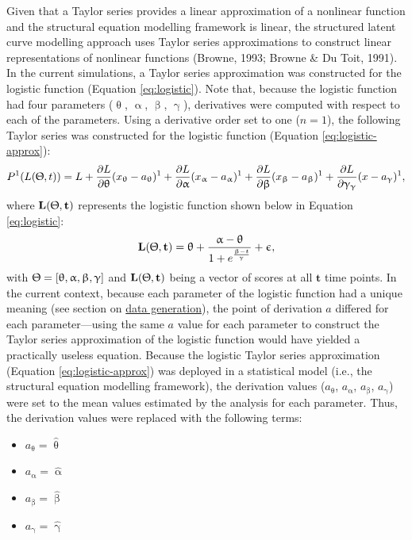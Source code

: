\documentclass[
12pt, %
twoside,
english]{guelphthesis}
\theoremstyle{definition}
\theoremstyle{definition}
\theoremstyle{definition}
\theoremstyle{definition}
\theoremstyle{remark}
\begin{document}
Given that a Taylor series provides a linear approximation of a
nonlinear function and the structural equation modelling framework is linear, the structured latent curve modelling approach uses Taylor series approximations to construct linear representations of nonlinear functions (Browne, 1993; Browne \& Du Toit, 1991). In the current simulations, a Taylor series approximation was constructed for the logistic function (Equation \ref{eq:logistic}). Note that, because the logistic function had four parameters (\(\uptheta\),
\(\upalpha\), \(\upbeta\), \(\upgamma\)), derivatives were computed with
respect to each of the parameters. Using a derivative order set to one
(\(n = 1\)), the following Taylor series was constructed for the logistic
function (Equation \ref{eq:logistic-approx}):
\begin{align}
 P^1(L(\Uptheta, t)) = L + \frac{\partial L}{\partial \uptheta}(x_{\uptheta}-a_{\uptheta})^1 + \frac{\partial L}{\partial \upalpha}(x_{\upalpha}-a_{\upalpha})^1 + \frac{\partial L}{\partial \upbeta}(x_{\upbeta}-a_{\upbeta})^1 + \frac{\partial L}{\partial \upgamma_{\upgamma}}(x-a_{\upgamma})^1, 
\label{eq:logistic-approx}
\end{align}
\noindent where \(\mathbf{L(\Uptheta, t)}\) represents the logistic function shown below in
Equation \ref{eq:logistic}:
\begin{align}
  \mathbf{L(\Uptheta, t)} = \uptheta + \frac{\upalpha - \uptheta}{{1 + e^\frac{\upbeta - t}{\upgamma}}} + \upepsilon, 
\label{eq:logistic}
\end{align}
\noindent with \(\Uptheta = [\uptheta, \upalpha, \upbeta, \upgamma]\) and \(\mathbf{L(\Uptheta, t)}\) being a vector of scores at all \(\mathbf{t}\) time points. In the current context, because each parameter of the logistic function had a unique meaning (see section on \protect\hyperlink{data-generation-1}{data generation}), the point of derivation \(a\) differed for each parameter---using the same \(a\) value for each parameter to construct the
Taylor series approximation of the logistic function would have yielded
a practically useless equation. Because the logistic Taylor series
approximation (Equation \ref{eq:logistic-approx}) was deployed in a
statistical model (i.e., the structural equation modelling framework), the derivation values
(\(a_{\uptheta}\), \(a_{\upalpha}\), \(a_{\upbeta}\), \(a_{\upgamma}\)) were set
to the mean values estimated by the analysis for each parameter. Thus, the
derivation values were replaced with the following terms:
\begin{itemize}
\tightlist
\item
  \(a_{\uptheta} = \hat{\uptheta}\)
\item
  \(a_{\upalpha} = \hat{\upalpha}\)
\item
  \(a_{\upbeta} = \hat{\upbeta}\)
\item
  \(a_{\upgamma} = \hat{\upgamma}\)
\end{itemize}
\end{document}
